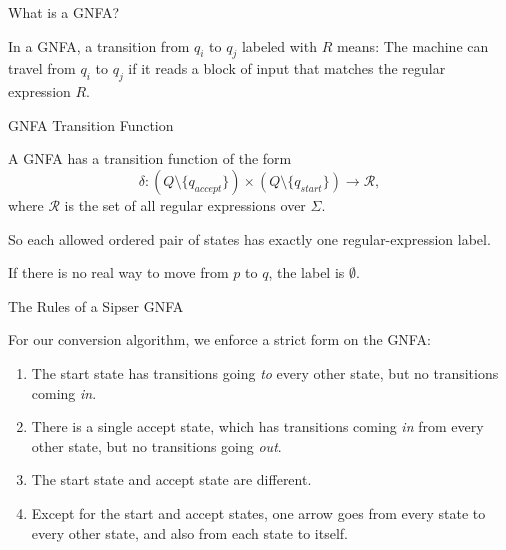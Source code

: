 \documentclass[10pt,aspectratio=169]{beamer}
\begin{document}
\begin{frame}{What is a GNFA?}

In a GNFA, a transition from $q_i$ to $q_j$ labeled with $R$ means: 
The machine can travel from $q_i$ to $q_j$ if it reads a block of input that matches the regular expression $R$.

\vspace{1em}

\begin{center}
\end{center}

\end{frame}


\begin{frame}{GNFA Transition Function}

A GNFA has a transition function of the form
\[
\delta : (Q\setminus\{q_{accept}\}) \times (Q\setminus\{q_{start}\}) \to \mathcal R,
\]
where $\mathcal R$ is the set of all regular expressions over $\Sigma$.

\vspace{0.8em}
So each allowed ordered pair of states has exactly one regular-expression label.

\vspace{0.8em}
If there is no real way to move from $p$ to $q$, the label is $\emptyset$.

\end{frame}

\begin{frame}{The Rules of a Sipser GNFA}

For our conversion algorithm, we enforce a strict form on the GNFA:

\begin{enumerate}
    \item The start state has transitions going \textit{to} every other state, but no transitions coming \textit{in}.
    \item There is a single accept state, which has transitions coming \textit{in} from every other state, but no transitions going \textit{out}.
    \item The start state and accept state are different.
    \item Except for the start and accept states, one arrow goes from every state to every other state, and also from each state to itself.
\end{enumerate}

\end{frame}
\end{document}
